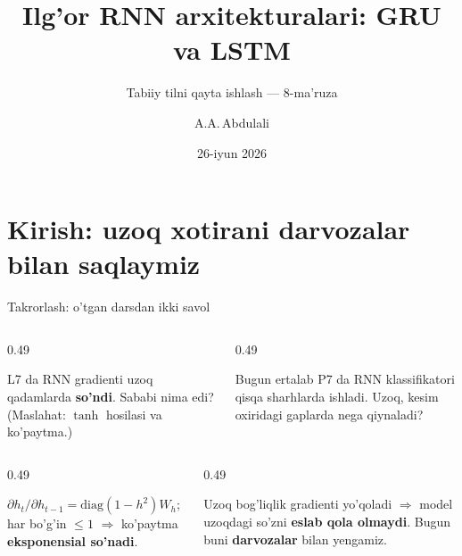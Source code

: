 \documentclass[aspectratio=169,11pt]{beamer}
\title[GRU va LSTM]{Ilg'or RNN arxitekturalari: GRU va LSTM}
\subtitle{Tabiiy tilni qayta ishlash --- 8-ma'ruza}
\author[A.A.\,Abdulali]{A.A.\,Abdulali}
\date{26-iyun 2026}
\institute{11:00--12:20 \quad$\cdot$\quad mavzu \textnumero{}8}
\begin{document}

\maketitle

\section[Kirish]{Kirish: uzoq xotirani darvozalar bilan saqlaymiz}

\begin{frame}{Takrorlash: o'tgan darsdan ikki savol}
  \begin{columns}[T]
    \begin{column}{0.49\textwidth}
      \begin{tcolorbox}[warnbox,title=1-savol]
        \small
        L7 da RNN gradienti uzoq qadamlarda \textbf{so'ndi}. Sababi nima edi?
        (Maslahat: $\tanh$ hosilasi va ko'paytma.)
      \end{tcolorbox}
    \end{column}
    \begin{column}{0.49\textwidth}
      \begin{tcolorbox}[warnbox,title=2-savol]
        \small
        Bugun ertalab P7 da RNN klassifikatori qisqa sharhlarda ishladi. Uzoq,
        kesim oxiridagi gaplarda nega qiynaladi?
      \end{tcolorbox}
    \end{column}
  \end{columns}
  \pause
  \vspace{4pt}
  \begin{columns}[T]
    \begin{column}{0.49\textwidth}
      \begin{tcolorbox}[okbox,title=1-javob]
        \small
        $\partial h_t/\partial h_{t-1}=\mathrm{diag}(1-h^2)W_h$; har bo'g'in
        $\leq 1$ $\Rightarrow$ ko'paytma \textbf{eksponensial so'nadi}.
      \end{tcolorbox}
    \end{column}
    \begin{column}{0.49\textwidth}
      \begin{tcolorbox}[okbox,title=2-javob]
        \small
        Uzoq bog'liqlik gradienti yo'qoladi $\Rightarrow$ model uzoqdagi so'zni
        \textbf{eslab qola olmaydi}. Bugun buni \textbf{darvozalar} bilan yengamiz.
      \end{tcolorbox}
    \end{column}
  \end{columns}
\end{frame}
\end{document}
